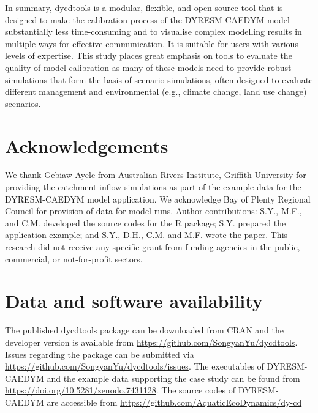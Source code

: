 In summary, dycdtools is a modular, flexible, and open-source tool that is designed to make the calibration process of the DYRESM-CAEDYM model substantially less time-consuming and to visualise complex modelling results in multiple ways for effective communication. It is suitable for users with various levels of expertise. This study places great emphasis on tools to evaluate the quality of model calibration as many of these models need to provide robust simulations that form the basis of scenario simulations, often designed to evaluate different management and environmental (e.g., climate change, land use change) scenarios.\par

\section{Acknowledgements}

We thank Gebiaw Ayele from Australian Rivers Institute, Griffith University for providing the catchment inflow simulations as part of the example data for the DYRESM-CAEDYM model application. We acknowledge Bay of Plenty Regional Council for provision of data for model runs. Author contributions: S.Y., M.F., and C.M. developed the source codes for the R package; S.Y. prepared the application example; and S.Y., D.H., C.M. and M.F. wrote the paper. This research did not receive any specific grant from funding agencies in the public, commercial, or not-for-profit sectors.\par

\section{Data and software availability}

The published dycdtools package can be downloaded from CRAN and the developer version is available from \url{ https://github.com/SongyanYu/dycdtools}. Issues regarding the package can be submitted via \url{https://github.com/SongyanYu/dycdtools/issues}. The executables of DYRESM-CAEDYM and the example data  supporting the case study can be found from \url{https://doi.org/10.5281/zenodo.7431128}. The source codes of DYRESM-CAEDYM are accessible from \url{https://github.com/AquaticEcoDynamics/dy-cd}\par



\address{Songyan Yu\\
  Griffith University\\
  Australian Rivers Institute and School of Environment and Science\\
  Australia\\
  ORCID: 0000-0001-5765-7060\\
  }

